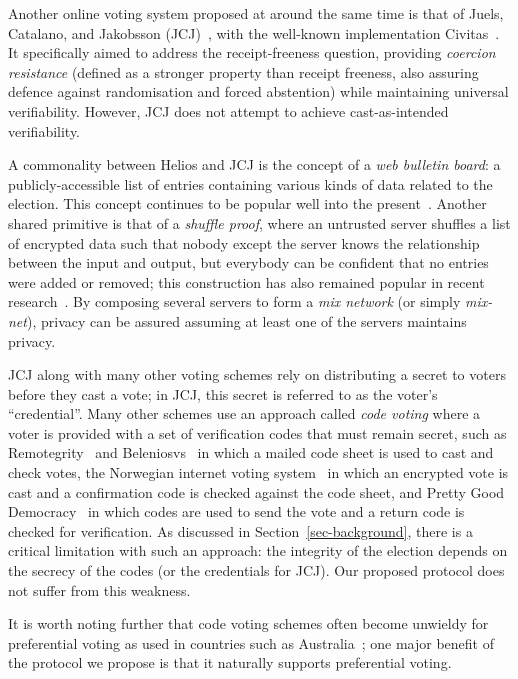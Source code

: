 \documentclass[12pt,a4paper]{article}
\theoremstyle{definition}
\begin{document}
Another online voting system proposed at around the same time is that of Juels, Catalano, and Jakobsson (JCJ)~\cite{juels2010coercion}, with the well-known implementation Civitas~\cite{clarkson2008civitas}. It specifically aimed to address the receipt-freeness question, providing \textit{coercion resistance} (defined as a stronger property than receipt freeness, also assuring defence against randomisation and forced abstention) while maintaining universal verifiability. However, JCJ does not attempt to achieve cast-as-intended verifiability.

A commonality between Helios and JCJ is the concept of a \textit{web bulletin board}: a publicly-accessible list of entries containing various kinds of data related to the election. This concept continues to be popular well into the present~\cite{kiayias2018security}. Another shared primitive is that of a \textit{shuffle proof}, where an untrusted server shuffles a list of encrypted data such that nobody except the server knows the relationship between the input and output, but everybody can be confident that no entries were added or removed; this construction has also remained popular in recent research~\cite{cortier2017machine}. By composing several servers to form a \textit{mix network} (or simply \textit{mix-net}), privacy can be assured assuming at least one of the servers maintains privacy.

JCJ along with many other voting schemes rely on distributing a secret to voters before they cast a vote; in JCJ, this secret is referred to as the voter's ``credential''. Many other schemes use an approach called \textit{code voting} where a voter is provided with a set of verification codes that must remain secret, such as Remotegrity~\cite{zagorski2013remotegrity} and Beleniosvs~\cite{cortier2019beleniosvs} in which a mailed code sheet is used to cast and check votes, the Norwegian internet voting system~\cite{gjosteen2011norwegian} in which an encrypted vote is cast and a confirmation code is checked against the code sheet, and Pretty Good Democracy~\cite{ryan2009pretty} in which codes are used to send the vote and a return code is checked for verification. As discussed in Section~\ref{sec-background}, there is a critical limitation with such an approach: the integrity of the election depends on the secrecy of the codes (or the credentials for JCJ). Our proposed protocol does not suffer from this weakness.

It is worth noting further that code voting schemes often become unwieldy for preferential voting as used in countries such as Australia~\cite{aditya2003secure}; one major benefit of the protocol we propose is that it naturally supports preferential voting.
\end{document}
